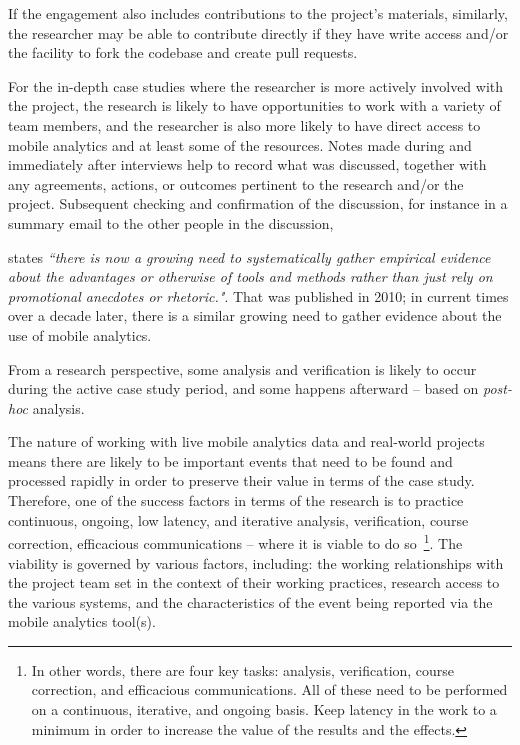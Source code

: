 If the engagement also includes contributions to the project's materials, similarly, the researcher may be able to contribute directly if they have write access and/or the facility to fork the codebase and create pull requests.

For the in-depth case studies where the researcher is more actively involved with the project, the research is likely to have opportunities to work with a variety of team members, and the researcher is also more likely to have direct access to mobile analytics and at least some of the resources. Notes made during and immediately after interviews help to record what was discussed, together with any agreements, actions, or outcomes pertinent to the research and/or the project. Subsequent checking and confirmation of the discussion, for instance in a summary email to the other people in the discussion, 

\citet[p.250]{falessi2010_applying_ESE_to_sw_architecture_etc} states \emph{``there is now a growing need to systematically gather empirical evidence about the advantages or otherwise of tools and methods rather than just rely on promotional anecdotes or rhetoric."}. That was published in 2010; in current times over a decade later, there is a similar growing need to gather evidence about the use of mobile analytics.


From a research perspective, some analysis and verification is likely to occur during the active case study period, and some happens afterward -- based on \emph{post-hoc} analysis.

The nature of working with live mobile analytics data and real-world projects means there are likely to be important events that need to be found and processed rapidly in order to preserve their value in terms of the case study. Therefore, one of the success factors in terms of the research is to practice continuous, ongoing, low latency, and iterative analysis, verification, course correction, efficacious communications -- where it is viable to do so~\footnote{In other words, there are four key tasks: analysis, verification, course correction, and efficacious communications. All of these need to be performed on a continuous, iterative, and ongoing basis. Keep latency in the work to a minimum in order to increase the value of the results and the effects.}. The viability is governed by various factors, including: the working relationships with the project team set in the context of their working practices, research access to the various systems, and the characteristics of the event being reported via the mobile analytics tool(s). 


